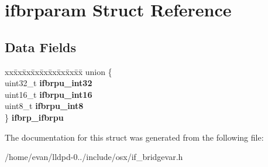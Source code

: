 \section{ifbrparam \-Struct \-Reference}
\label{structifbrparam}
\subsection*{\-Data \-Fields}
\begin{DoxyCompactItemize}
\item 
\begin{tabbing}
xx\=xx\=xx\=xx\=xx\=xx\=xx\=xx\=xx\=\kill
union \{\\
\>uint32\_t {\bfseries ifbrpu\_int32}\\
\>uint16\_t {\bfseries ifbrpu\_int16}\\
\>uint8\_t {\bfseries ifbrpu\_int8}\\
\} {\bfseries ifbrp\_ifbrpu}\label{structifbrparam_a8f4db2d5a79c5fa76560afef3aaf9dce}
\\

\end{tabbing}\end{DoxyCompactItemize}


\-The documentation for this struct was generated from the following file\-:\begin{DoxyCompactItemize}
\item 
/home/evan/lldpd-\/0../include/osx/if\-\_\-bridgevar.\-h\end{DoxyCompactItemize}
